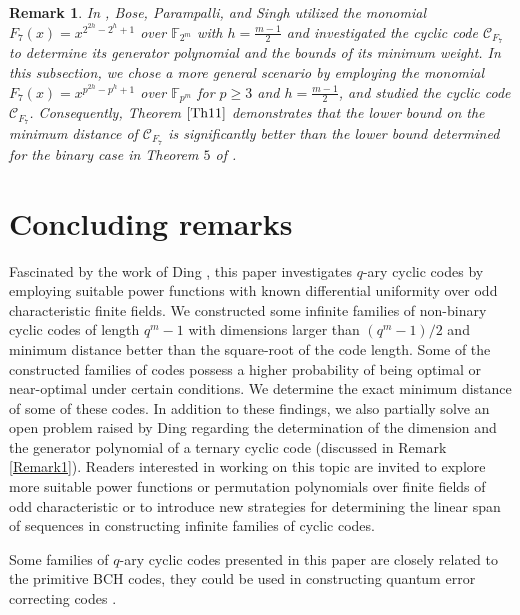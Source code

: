 \documentclass[pdflatex,sn-mathphys-num]{sn-jnl}%
\theoremstyle{thmstyleone}%
\theoremstyle{thmstyletwo}%
\newtheorem{remark}{Remark}%
\theoremstyle{thmstylethree}%
\begin{document}
\begin{remark}
    In \textnormal{\cite[Section $3.5$]{Bose}}, Bose, Parampalli, and Singh utilized the monomial $F_{7}(x)=x^{2^{2h}-2^{h}+1}$ over $\mathbb{F}_{2^m}$ with $h=\frac{m-1}{2}$ and investigated the cyclic code $\mathcal{C}_{F_{7}}$ to determine its generator polynomial and the bounds of its minimum weight. In this subsection, we chose a more general scenario by employing the monomial $F_{7}(x)=x^{p^{2h}-p^{h}+1}$ over $\mathbb{F}_{p^m}$ for $p\geq 3$ and $h=\frac{m-1}{2}$, and studied the cyclic code $\mathcal{C}_{F_{7}}$. Consequently, Theorem $\ref{Th11}$ demonstrates that the lower bound on the minimum distance of $\mathcal{C}_{F_{7}}$ is significantly better than the lower bound determined for the binary case in Theorem $5$ of \textnormal{\cite{Bose}}.  
\end{remark}
\section{Concluding remarks}\label{sec4}
Fascinated by the work of Ding \cite{P3}, this paper investigates $q$-ary cyclic codes by employing suitable power functions with known differential uniformity over odd characteristic finite fields. We constructed some infinite families of non-binary cyclic codes of length $q^m-1$ with dimensions larger than $(q^m-1)/2$ and minimum distance better than the square-root of the code length. Some of the constructed families of codes possess a higher probability of being optimal or near-optimal under certain conditions. We determine the exact minimum distance of some of these codes. In addition to these findings, we also partially solve an open problem raised by Ding \cite{P3} regarding the determination of the dimension and the generator polynomial of a ternary cyclic code (discussed in Remark \ref{Remark1}). Readers interested in working on this topic are invited to explore more suitable power functions or permutation polynomials over finite fields of odd characteristic or to introduce new strategies for determining the linear span of sequences in constructing infinite families of cyclic codes.  
\par Some families of $q$-ary cyclic codes presented in this paper are closely related to the primitive BCH codes, they could be used in constructing quantum error correcting codes \cite{P-1,Quantum2}. 

\end{document}
